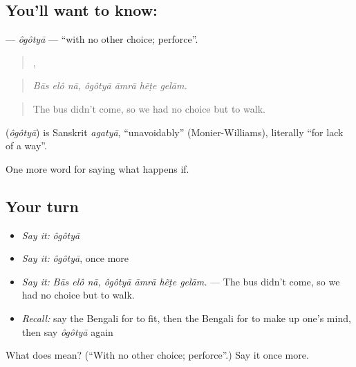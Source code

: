 \subsection*{You'll want to know: }
\textbf{} — \emph{ôgôtyā} — \textquotedblleft{}with no other choice; perforce\textquotedblright{}.

\begin{quote}
  ,    
\end{quote}

\begin{quote}
\emph{Bās elô nā, ôgôtyā āmrā hẽṭe gelām.}
\end{quote}

\begin{quote}
The bus didn't come, so we had no choice but to walk.
\end{quote}

\begin{cousinweb}
\textbf{} (\emph{ôgôtyā}) is Sanskrit \emph{agatyā}, \textquotedblleft{}unavoidably\textquotedblright{} (Monier-Williams), literally \textquotedblleft{}for lack of a way\textquotedblright{}.
\end{cousinweb}

\begin{grammarlens}[title={What you've built}]
One more word for saying what happens if.
\end{grammarlens}

\subsection*{Your turn}
\begin{itemize}
\raggedright
  \item \emph{Say it:} \emph{ôgôtyā}
  \item \emph{Say it:} \emph{ôgôtyā}, once more
  \item \emph{Say it:} \emph{Bās elô nā, ôgôtyā āmrā hẽṭe gelām.} — The bus didn't come, so we had no choice but to walk.
  \item \emph{Recall:} say the Bengali for to fit, then the Bengali for to make up one's mind, then say \emph{ôgôtyā} again
\end{itemize}

\begin{tcolorbox}[breakable,colback=teal!4,colframe=teal!35!black,title={Before you move on}]
What does  mean? (\textquotedblleft{}With no other choice; perforce\textquotedblright{}.) Say it once more.
\end{tcolorbox}
